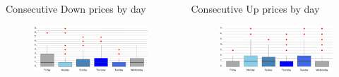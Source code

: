 \documentclass[final, xcolor=table]{beamer}\usepackage[]{graphicx}\usepackage[]{color}
\begin{document}
\begin{columns}[t]



\begin{column}{.48 \linewidth}

  \begin{block}{Consecutive Down prices by day}

   \begin{figure}[H]
    \includegraphics[scale=1]{figure/BP_Plot-3.pdf}
    \end{figure}

  \end{block}
  
\end{column}



\begin{column}{.48 \linewidth}
  
  \begin{block}{Consecutive Up prices by day}

   \begin{figure}[H]
    \includegraphics[scale=1]{figure/BP_Plot-4.pdf}
    \end{figure}

  \end{block}
  
\end{column}

\end{columns}
\end{document}
